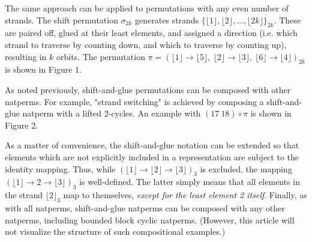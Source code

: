 \documentclass[12pt,reqno]{article}
\begin{document}
The same approach can be applied to permutations with any even number of strands. The shift permutation $\sigma_{2k}$ generates strands $\{ \lfloor 1 \rfloor,  \lfloor 2 \rfloor, \ldots, \lfloor 2k \rfloor \}_{2k}$. These are paired off, glued at their least elements, and assigned a direction (i.e. which strand to traverse by counting down, and which to traverse by counting up), resulting in $k$ orbits. The permutation $\pi = {( \lfloor 1 \rfloor \rightarrow \lfloor 5 \rfloor, \ \lfloor 2 \rfloor \rightarrow \lfloor 3 \rfloor, \ \lfloor 6 \rfloor \rightarrow \lfloor 4 \rfloor )}_{2k}$ is shown in Figure 1. %


As noted previously, shift-and-glue permutations can be composed with other natperms. For example, "strand switching" is achieved by composing a shift-and-glue natperm with a lifted 2-cycles. An example with $(17 \ 18) \circ \pi$ is shown in Figure 2.


As a matter of convenience, the shift-and-glue notation can be extended so that elements which are not explicitly included in a representation are subject to the identity mapping. Thus, while  ${( \lfloor 1 \rfloor \rightarrow \lfloor 2 \rfloor \rightarrow \lfloor 3 \rfloor)}_3$ is excluded, the mapping ${( \lfloor 1 \rfloor \rightarrow 2 \rightarrow \lfloor 3 \rfloor )}_3$ is well-defined. The latter simply means that all elements in the strand ${\lfloor 2 \rfloor}_3$ map to themselves, \textit{except for the least element 2 itself}. Finally, as with all natperms, shift-and-glue natperms can be composed with any other natperms, including bounded block cyclic natperms. (However, this article will not visualize the structure of such compositional examples.)
\end{document}
